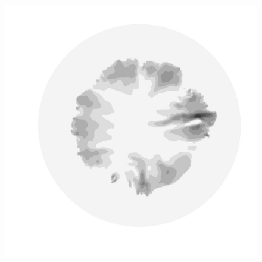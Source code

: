\begin{figure}
\begin{minipage}[b]{0.30\linewidth}
  \end{minipage}
  \quad
  \begin{minipage}[b]{0.30\linewidth}
    \includegraphics[width=1.0\textwidth]{images/EISMINT_II/U/U_mag_5000.jpg}
  \end{minipage}
  

\end{figure}
